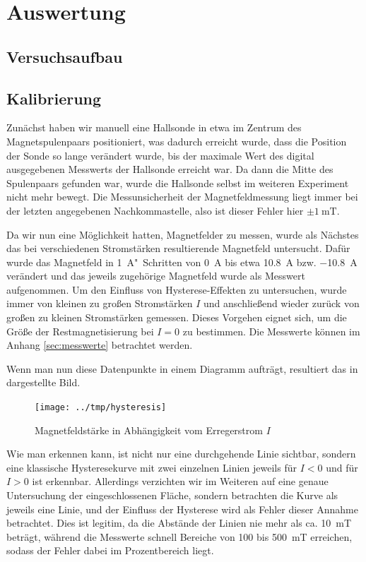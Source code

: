 \section{Auswertung}
\subsection{Versuchsaufbau}

\subsection{Kalibrierung}
Zunächst haben wir manuell eine Hallsonde in etwa im Zentrum des
Magnetspulenpaars positioniert, was dadurch erreicht wurde, dass die Position
der Sonde so lange verändert wurde, bis der maximale Wert des digital
ausgegebenen Messwerts der Hallsonde erreicht war. Da dann die Mitte des
Spulenpaars gefunden war, wurde die Hallsonde selbst im weiteren Experiment
nicht mehr bewegt. Die Messunsicherheit der Magnetfeldmessung liegt immer bei
der letzten angegebenen Nachkommastelle, also ist dieser Fehler hier $\pm
\SI{1}{\milli\tesla}$.

Da wir nun eine Möglichkeit hatten, Magnetfelder zu messen, wurde als Nächstes
das bei verschiedenen Stromstärken resultierende Magnetfeld untersucht. Dafür
wurde das Magnetfeld in \SI{1}{\ampere}"~Schritten von \SI{0}{\ampere} bis etwa \SI{10,8}{\ampere} bzw.
\SI{-10,8}{\ampere} verändert und das jeweils
zugehörige Magnetfeld wurde als Messwert aufgenommen. Um den Einfluss von
Hysterese-Effekten zu untersuchen, wurde immer von kleinen zu großen
Stromstärken $I$ und anschließend wieder zurück von großen zu kleinen
Stromstärken gemessen. Dieses Vorgehen eignet sich, um die Größe der
Restmagnetisierung bei $I=0$ zu bestimmen. Die Messwerte können im Anhang
\ref{sec:messwerte} betrachtet werden. 

Wenn man nun diese Datenpunkte in einem Diagramm aufträgt, resultiert das in
 dargestellte Bild.

\begin{figure}[htb]
   \centering
   \texttt{[image: ../tmp/hysteresis]}
   \caption{Magnetfeldstärke in Abhängigkeit vom Erregerstrom $I$}
   \label{fig:hysterese}
\end{figure}

Wie man erkennen kann, ist nicht nur eine durchgehende Linie sichtbar, sondern
eine klassische Hysteresekurve mit zwei einzelnen Linien jeweils für $I<0$ und
für $I>0$ ist erkennbar. Allerdings verzichten wir im Weiteren auf eine genaue
Untersuchung der eingeschlossenen Fläche, sondern betrachten die Kurve als
jeweils eine Linie, und der Einfluss der Hysterese wird als Fehler dieser
Annahme betrachtet. Dies ist legitim, da die Abstände der Linien nie mehr als
ca. \SI{10}{\milli\tesla} beträgt, während die Messwerte schnell Bereiche von
100 bis \SI{500}{\milli\tesla} erreichen, sodass der Fehler dabei im
Prozentbereich liegt.

